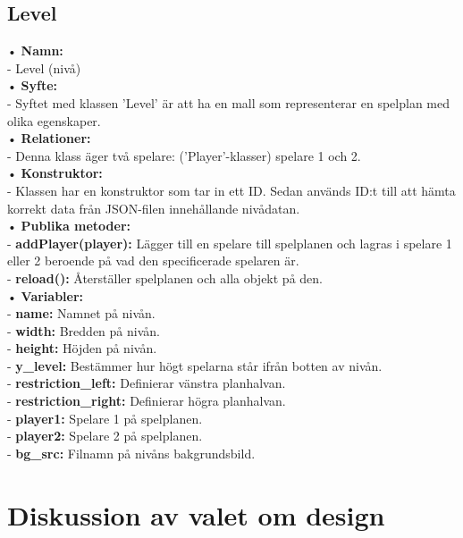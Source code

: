 \documentclass{TDP003mall}
\begin{document}
\subsection{Level}
• \textbf{Namn:} \\
\indent- Level (nivå) \\
• \textbf{Syfte:} \\
\indent- Syftet med klassen 'Level' är att ha en mall som representerar en spelplan med olika egenskaper.
\\
• \textbf{Relationer:} \\
\indent- Denna klass äger två spelare: ('Player'-klasser) spelare 1 och 2. \\
• \textbf{Konstruktor:} \\
\indent- Klassen har en konstruktor som tar in ett ID. Sedan används ID:t till att hämta korrekt data från JSON-filen innehållande nivådatan. \\
• \textbf{Publika metoder:} \\
\indent- \textbf{addPlayer(player):} Lägger till en spelare till spelplanen och lagras i spelare 1 eller 2 beroende på vad den specificerade spelaren är. \\
\indent- \textbf{reload():} Återställer spelplanen och alla objekt på den. \\
• \textbf{Variabler:} \\
\indent- \textbf{name:} Namnet på nivån. \\
\indent- \textbf{width:} Bredden på nivån. \\
\indent- \textbf{height:} Höjden på nivån. \\
\indent- \textbf{y\_level:} Bestämmer hur högt spelarna står ifrån botten av nivån. \\
\indent- \textbf{restriction\_left:} Definierar vänstra planhalvan. \\
\indent- \textbf{restriction\_right:} Definierar högra planhalvan. \\
\indent- \textbf{player1:} Spelare 1 på spelplanen. \\
\indent- \textbf{player2:} Spelare 2 på spelplanen. \\
\indent- \textbf{bg\_src:} Filnamn på nivåns bakgrundsbild. \\

\section{Diskussion av valet om design}
\end{document}
